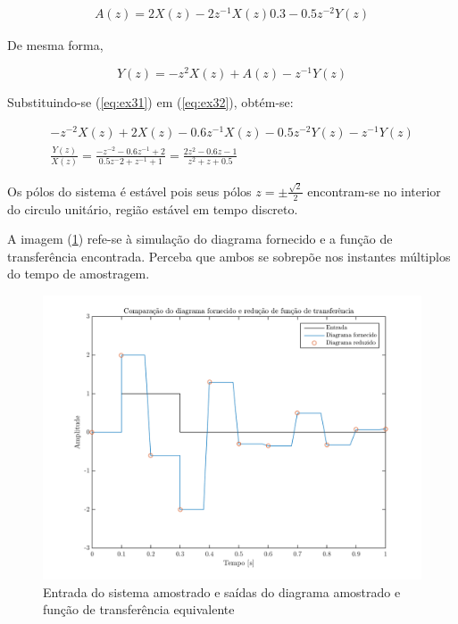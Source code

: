 \documentclass{article}
\begin{document}
\begin{equation}
\begin{split}
\label{eq:ex31}
A(z) = 2 X(z) - 2 z^{-1} X(z) 0.3 - 0.5 z^{-2} Y(z)
\end{split}
\end{equation}

De mesma forma,

\begin{equation}
\label{eq:ex32}
Y(z) = -z^2 X(z) + A(z) - z^{-1} Y(z)
\end{equation}

Substituindo-se (\ref{eq:ex31}) em (\ref{eq:ex32}), obtém-se:

\begin{equation}
\begin{split}
-z^{-2} X(z) + 2 X(z) - 0.6  z^{-1} X(z) - 0.5 z^{-2} Y(z) - z^{-1} Y(z) \\
\frac{Y(z)}{X(z)} = \frac{- z^{-2} - 0.6 z^{-1} + 2}{0.5 z^-2 + z^{-1} + 1} = \frac{2 z^{2} - 0.6 z - 1}{z^2 + z + 0.5}
\end{split}
\end{equation}

Os pólos do sistema é estável pois seus pólos $z = \pm\frac{\sqrt{2}}{2}$ encontram-se no interior do circulo unitário, região estável em tempo discreto.

A imagem (\ref{fig:ex3sim}) refe-se à simulação do diagrama fornecido e a função de transferência encontrada. Perceba que ambos se sobrepõe nos instantes múltiplos do tempo de amostragem.

\begin{figure}[!h]
	\center
	\includegraphics[width=\textwidth]{./images/ex31.png}
	\caption{Entrada do sistema amostrado e saídas do diagrama amostrado e função de transferência equivalente}
	\label{fig:ex3sim}
\end{figure}
\end{document}
